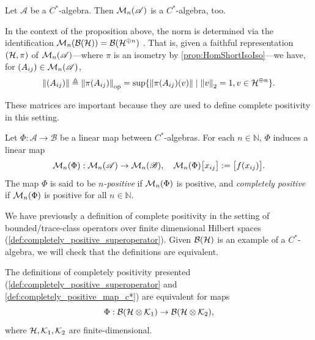 \begin{proposition} \cite[p.16-17]{paulsenCompletelyBoundedMaps2003}
  Let $ \mathscr{A}$ be a $C^*$-algebra. Then $\mathcal{M}_{n}(\mathscr{A})$ is a $C^*$-algebra, too.
\end{proposition}

In the context of the proposition above, the norm is determined via the identification $\mathcal{M}_n(\mathcal{B}(\mathcal{H})) =\mathcal{B}(\mathcal{H}^{\oplus n})$
\cite[Exercises~1.1 and~1.2]{paulsenCompletelyBoundedMaps2003}. That is, given a faithful representation \((\mathcal{H}, \pi)\) of \(\mathcal{M}_{n}(\mathscr{A})\)---where \(\pi\) is an isometry by \autoref{prop:HomShortIsoIso}---we have, for \((A_{ij}) \in \mathcal{M}_{n}(\mathscr{A})\),
\[
\left\lVert (A_{ij}) \right\rVert \triangleq \left\lVert \pi(A_{ij}) \right\rVert_{\text{op}} = \sup\{ \left\lVert \pi(A_{ij})(v) \right\rVert \mid \left\lVert v \right\rVert_{2} = 1, v \in \mathcal{H}^{\oplus n} \}.
\]


These matrices are important because they are used to define complete positivity in this setting.

\begin{definition} \label{def:completely_positive_map_c*}
  Let \( \Phi : \mathscr{A} \to \mathscr{B} \) be a linear map between \( C^* \)-algebras. For each \( n \in \mathbb{N} \), \( \Phi \) induces a linear map
\[
\mathcal{M}_{n}(\Phi) :\mathcal{M}_{n}(\mathscr{A}) \to \mathcal{M}_{n}(\mathscr{B}), \quad \mathcal{M}_{n}(\Phi)\big[ x_{ij} \big] := \big[ f(x_{ij}) \big].
\]
The map \( \Phi \) is said to be \emph{\( n \)-positive} if \(\mathcal{M}_{n}(\Phi) \) is positive, and \emph{completely positive} if \( \mathcal{M}_{n}(\Phi) \) is positive for all \( n \in \mathbb{N} \).
\end{definition}

We have previously a definition of complete positivity in the setting of bounded/trace-class operators over finite dimensional Hilbert spaces (\autoref{def:completely_positive_superoperator}). Given $\mathcal{B}(\mathcal{H})$ is an example of a $C^*$-algebra, we will check that the definitions are equivalent.


\begin{proposition} \label{pro:cp_compatible}
  The definitions of completely positivity presented (\autoref{def:completely_positive_superoperator} and \autoref{def:completely_positive_map_c*}) are equivalent for maps 
  $$\Phi: \mathcal{B}(\mathcal{H} \otimes \mathcal{K}_1 ) \to \mathcal{B}(\mathcal{H} \otimes \mathcal{K}_2), $$
where $\mathcal{H}, \mathcal{K}_1,\mathcal{K}_2$ are finite-dimensional.
\end{proposition}

